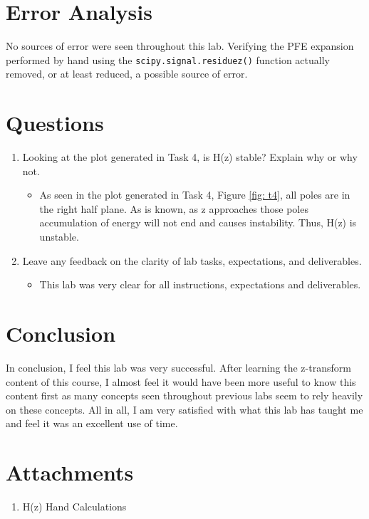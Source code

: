 \documentclass[12pt]{report}
\begin{document}
\section{Error Analysis}\label{section: ErAn}
No sources of error were seen throughout this lab. Verifying the PFE expansion performed by hand using the \texttt{scipy.signal.residuez()} function
actually removed, or at least reduced, a possible source of error.

\section{Questions}\label{section: Questions}
\begin{enumerate}
  \item Looking at the plot generated in Task 4, is H(z) stable? Explain why or why not.
  \begin{itemize}
    \item As seen in the plot generated in Task 4, Figure \ref{fig: t4}, all poles are in the right half plane. As is known, as z approaches those poles accumulation
    of energy will not end and causes instability. Thus, H(z) is unstable.
  \end{itemize}
  \item Leave any feedback on the clarity of lab tasks, expectations, and deliverables.
  \begin{itemize}
    \item This lab was very clear for all instructions, expectations and deliverables.
  \end{itemize}
\end{enumerate}
\section{Conclusion}
In conclusion, I feel this lab was very successful. After learning the z-transform content of this course, I almost feel it would have
been more useful to know this content first as many concepts seen throughout previous labs seem to rely heavily on these concepts.
All in all, I am very satisfied with what this lab has taught me and feel it was an excellent use of time.
\newpage
\thispagestyle{customblank}
\section{Attachments}\label{section: Attachments}
\centering\begin{enumerate}
  \item H(z) Hand Calculations
\end{enumerate}
\vspace*{\fill}


% 


\end{document}
